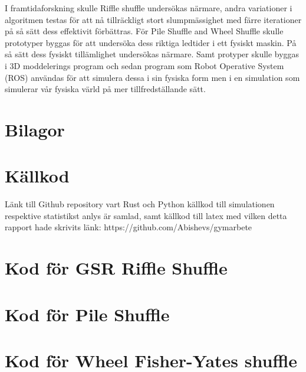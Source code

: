 \documentclass[swedish,a4paper]{article}
\renewcommand{\appendixpagename}{Bilagor}
\begin{document}
I framtidaforskning skulle Riffle shuffle undersökas närmare, andra variationer i
algoritmen testas för att nå tillräckligt stort slumpmässighet med färre
iterationer på så sätt dess effektivit förbättras. För Pile Shuffle and Wheel
Shuffle skulle prototyper byggas för att undersöka dess riktiga ledtider i ett
fysiskt maskin. På så sätt dess fysiskt tillämlighet undersökas närmare. Samt
protyper skulle byggas i 3D moddelerings program och sedan program som Robot
Operative System (ROS) användas för att simulera dessa i sin fysiska form men i
en simulation som simulerar vår fysiska värld på mer tillfredställande sätt.



\printbibliography[heading=bibintoc, title={Bibliografi}]

\appendix
\section*{\appendixpagename} 
\addcontentsline{toc}{section}{\appendixpagename} 

\section{Källkod}
\label{app:github}
Länk till Github repository vart Rust och Python källkod till simulationen 
respektive statistikst anlys är samlad, samt källkod till latex med
vilken detta rapport hade skrivits
länk: https://github.com/Abishevs/gymarbete

\section{Kod för GSR Riffle Shuffle}
\label{app:gsr}
% 
% 

\section{Kod för Pile Shuffle}
\label{app:pile}
% 

\section{Kod för Wheel Fisher-Yates shuffle}
\label{app:wheel}
% 
\end{document}
